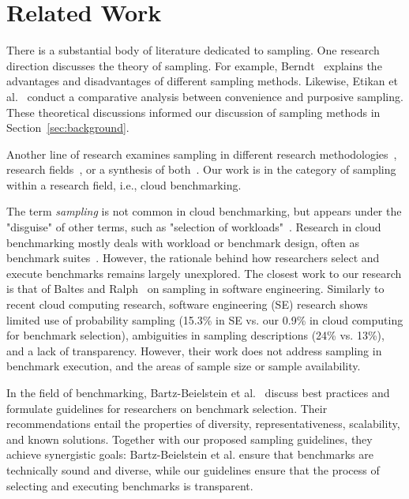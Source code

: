 \section{Related Work}
\label{sec:related_work}




There is a substantial body of literature dedicated to sampling. One research direction discusses the theory of sampling. For example, Berndt~\cite{berndtSamplingMethods2020} explains the advantages and disadvantages of different sampling methods. Likewise, Etikan et al.~\cite{etikanComparisonConvenienceSampling2016} conduct a comparative analysis between convenience and purposive sampling. These theoretical discussions informed our discussion of sampling methods in Section~\ref{sec:background}.

Another line of research examines sampling in different research methodologies~\cite{cashSamplingDesignResearch2022}, research fields~\cite{amirThereNoRandom2018, baltesSamplingSoftwareEngineering2022}, or a synthesis of both~\cite{hieblSampleSelectionSystematic2023}. Our work is in the category of sampling within a research field, i.e., cloud benchmarking.

The term \textit{sampling} is not common in cloud benchmarking, but appears under the "disguise" of other terms, such as "selection of workloads"~\cite{muhlbauerAnalysingImpactWorkloads2023}. Research in cloud benchmarking mostly deals with workload or benchmark design, often as benchmark suites~\cite{rajputEdgefaasbenchBenchmarkingEdge2022, baurleCombFlexibleApplicationoriented2022, wenCharacterizingCommodityServerless2023}. However, the rationale behind how researchers select and execute benchmarks remains largely unexplored.
The closest work to our research is that of Baltes and Ralph~\cite{baltesSamplingSoftwareEngineering2022} on sampling in software engineering. Similarly to recent cloud computing research, software engineering (SE) research shows limited use of probability sampling (15.3\% in SE vs. our 0.9\% in cloud computing for benchmark selection), ambiguities in sampling descriptions (24\% vs. 13\%), and a lack of transparency. However, their work does not address sampling in benchmark execution, and the areas of sample size or sample availability.

In the field of benchmarking, Bartz-Beielstein et al.~\cite{bartz-beielsteinBenchmarkingOptimizationBest2020} discuss best practices and formulate guidelines for researchers on benchmark selection. Their recommendations entail the properties of diversity, representativeness, scalability, and known solutions. Together with our proposed sampling guidelines, they achieve synergistic goals: Bartz-Beielstein et al. ensure that benchmarks are technically sound and diverse, while our guidelines ensure that the process of selecting and executing benchmarks is transparent.

